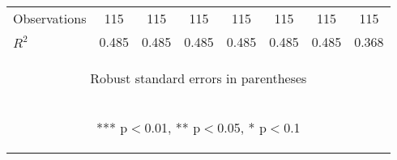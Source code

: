 \begin{center}
\begin{tabular}{lccccccc}
Observations & 115 & 115 & 115 & 115 & 115 & 115 & 115 \\
 $R^2$ & 0.485 & 0.485 & 0.485 & 0.485 & 0.485 & 0.485 & 0.368 \\ \hline
\multicolumn{8}{c}{\begin{footnotesize} Robust standard errors in parentheses\end{footnotesize}} \\
\multicolumn{8}{c}{\begin{footnotesize} *** p$<$0.01, ** p$<$0.05, * p$<$0.1\end{footnotesize}} \\
\end{tabular}
\end{center}
